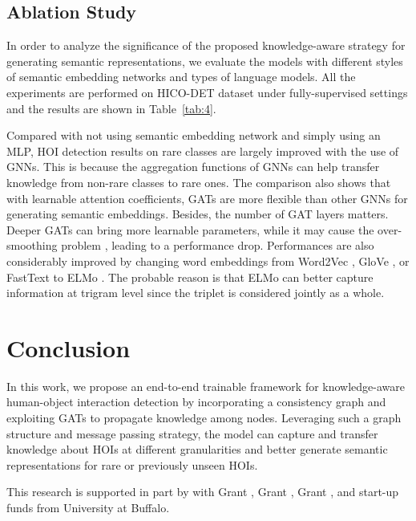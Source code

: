 \documentclass[sigconf,screen]{acmart}
\begin{document}
\subsection{Ablation Study}

In order to analyze the significance of the proposed knowledge-aware strategy for generating semantic representations, we evaluate the models with different styles of semantic embedding networks and types of language models. All the experiments are performed on HICO-DET dataset under fully-supervised settings and the results are shown in Table~\ref{tab:4}.

Compared with not using semantic embedding network and simply using an MLP, HOI detection results on rare classes are largely improved with the use of GNNs. This is because the aggregation functions of GNNs can help transfer knowledge from non-rare classes to rare ones. The comparison also shows that with learnable attention coefficients, GATs are more flexible than other GNNs for generating semantic embeddings. Besides, the number of GAT layers matters. Deeper GATs can bring more learnable parameters, while it may cause the over-smoothing problem \cite{li2019deepgcns}, leading to a performance drop. Performances are also considerably improved by changing word embeddings from Word2Vec \cite{mikolov2013efficient}, GloVe \cite{pennington2014glove}, or FastText \cite{joulin2016bag} to ELMo \cite{peters2018deep}. The probable reason is that ELMo can better capture information at trigram level since the triplet is considered jointly as a whole. 

\section{Conclusion}

In this work, we propose an end-to-end trainable framework for knowledge-aware human-object interaction detection by incorporating a consistency graph and exploiting GATs to propagate knowledge among nodes. Leveraging such a graph structure and message passing strategy, the model can capture and transfer knowledge about HOIs at different granularities and better generate semantic representations for rare or previously unseen HOIs. 


\begin{acks}

This research is supported in part by  with Grant ,  Grant ,  Grant , and start-up funds from University at Buffalo.

\end{acks} 


\end{document}
